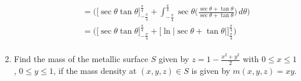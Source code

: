 \documentclass{article}
\begin{document}
\begin{enumerate}
\begin{enumerate}
\begin{align*}
             &= \Big( \Big[ \sec \theta \tan \theta \Big]_{-\frac{\pi}{4}}^{\frac{\pi}{4}} + \int_{-\frac{\pi}{4}}^{\frac{\pi}{4}} \sec \theta \Big( \frac{\sec \theta + \tan \theta}{\sec \theta + \tan \theta}\Big)\, d \theta \Big) \\
             &= \Big( \Big[ \sec \theta \tan \theta \Big]_{-\frac{\pi}{4}}^{\frac{\pi}{4}} + \Big[\ln|\sec \theta + \tan \theta |\Big]_{\frac{\pi}{4}}^{\frac{\pi}{4}} \Big) \\
        \end{align*} 
    \end{enumerate}
    \newpage
    \item Find the mass of the metallic surface $S$ given by $\displaystyle z = 1 - \frac{x^2 + y^2}{2}$ with $0 \leq x \leq 1$, $0 \leq y \leq 1$, if the mass density at $(x,y,z) \in S$ is given by $m(x,y,z) = xy$.
\end{enumerate}
\end{document}
